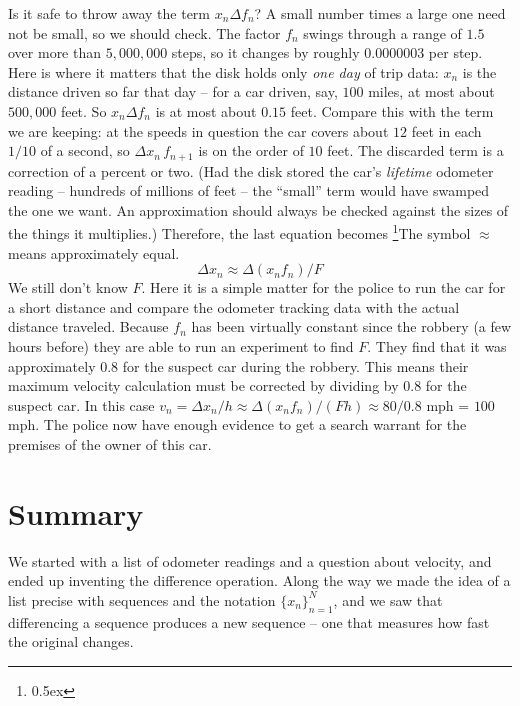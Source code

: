 Is it safe to throw away the term $x_n \Delta f_n$? A small number times a
large one need not be small, so we should check. The factor $f_n$ swings
through a range of $1.5$ over more than $5{,}000{,}000$ steps, so it changes by
roughly $0.0000003$ per step. Here is where it matters that the disk holds
only {\it one day\/} of trip data: $x_n$ is the distance driven so far that day
-- for a car driven, say, $100$ miles, at most about $500{,}000$ feet. So
$x_n \Delta f_n$ is at most about $0.15$ feet. Compare this with the term we
are keeping: at the speeds in question the car covers about $12$ feet in each
$1/10$ of a second, so $\Delta x_n \, f_{n+1}$ is on the order of $10$ feet.
The discarded term is a correction of a percent or two. (Had the disk stored
the car's {\it lifetime\/} odometer reading -- hundreds of millions of feet --
the ``small'' term would have swamped the one we want. An approximation
should always be checked against the sizes of the things it multiplies.)
Therefore, the last equation becomes%
\footnote{\kern 0.5pt \raise 0.5ex \hbox{\dag}}{The symbol $\approx$
  means approximately equal.}
$$
\Delta x_n  \approx \Delta (x_n f_n) / F
$$
We still don't know $F$. Here it is a simple matter for the police to 
run the car for a short distance and compare the odometer tracking data with
the actual distance traveled. Because $f_n$ has been virtually constant since the robbery (a few hours before)
they are able to run an experiment to find $F$. They find that it 
was approximately $0.8$ for the suspect car during the robbery. 
This means their maximum velocity calculation must be corrected by dividing by 0.8 for 
the suspect car. 
In this case $v_n = \Delta x_n /h \approx \Delta(x_n f_n) / (F h) \approx  80 / 0.8$ mph = $100$ mph. 
The police now have enough 
evidence to get a search warrant for the premises of the owner of this car.


\section{Summary}
We started with a list of odometer readings and a question about velocity, and
ended up inventing the difference operation. Along the way we made the idea of a
list precise with sequences and the notation $\{x_n\}_{n=1}^{N}$, and we saw that
differencing a sequence produces a new sequence -- one that measures how fast the
original changes.

